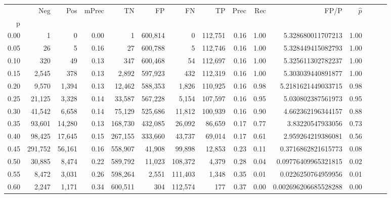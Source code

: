 \begin{tabular}{rrrrrrrrrrrrrrr}
\toprule
{} &      Neg &     Pos & mPrec &       TN &       FP &       FN &       TP &  Prec &   Rec &                    FP/P & $\hat{p}$ \\
p    &          &         &       &          &          &          &          &       &       &                         &           \\
\midrule
0.00 &        1 &       0 &  0.00 &        1 &  600,814 &        0 &  112,751 &  0.16 &  1.00 &       5.328680011707213 &      1.00 \\
0.05 &       26 &       5 &  0.16 &       27 &  600,788 &        5 &  112,746 &  0.16 &  1.00 &       5.328449415082793 &      1.00 \\
0.10 &      320 &      49 &  0.13 &      347 &  600,468 &       54 &  112,697 &  0.16 &  1.00 &       5.325611302782237 &      1.00 \\
0.15 &    2,545 &     378 &  0.13 &    2,892 &  597,923 &      432 &  112,319 &  0.16 &  1.00 &       5.303039440891877 &      1.00 \\
0.20 &    9,570 &   1,394 &  0.13 &   12,462 &  588,353 &    1,826 &  110,925 &  0.16 &  0.98 &      5.2181621449033715 &      0.98 \\
0.25 &   21,125 &   3,328 &  0.14 &   33,587 &  567,228 &    5,154 &  107,597 &  0.16 &  0.95 &       5.030802387561973 &      0.95 \\
0.30 &   41,542 &   6,658 &  0.14 &   75,129 &  525,686 &   11,812 &  100,939 &  0.16 &  0.90 &       4.662362196344157 &      0.88 \\
0.35 &   93,601 &  14,280 &  0.13 &  168,730 &  432,085 &   26,092 &   86,659 &  0.17 &  0.77 &        3.83220547933056 &      0.73 \\
0.40 &   98,425 &  17,645 &  0.15 &  267,155 &  333,660 &   43,737 &   69,014 &  0.17 &  0.61 &       2.959264219386081 &      0.56 \\
0.45 &  291,752 &  56,161 &  0.16 &  558,907 &   41,908 &   99,898 &   12,853 &  0.23 &  0.11 &      0.3716862821615773 &      0.08 \\
0.50 &   30,885 &   8,474 &  0.22 &  589,792 &   11,023 &  108,372 &    4,379 &  0.28 &  0.04 &     0.09776409965321815 &      0.02 \\
0.55 &    8,472 &   3,031 &  0.26 &  598,264 &    2,551 &  111,403 &    1,348 &  0.35 &  0.01 &      0.0226250764959956 &      0.01 \\
0.60 &    2,247 &   1,171 &  0.34 &  600,511 &      304 &  112,574 &      177 &  0.37 &  0.00 &    0.002696206685528288 &      0.00 \\

\end{tabular}
